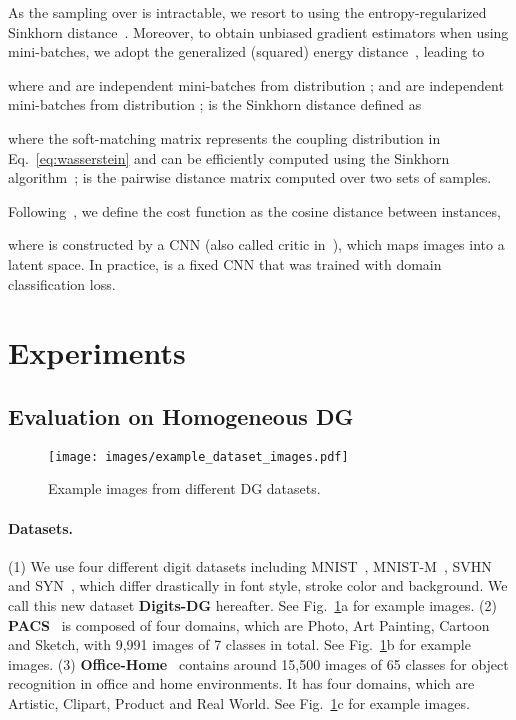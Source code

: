 \documentclass[runningheads]{llncs}
\begin{document}
As the sampling over  is intractable, we resort to using the entropy-regularized Sinkhorn distance~\cite{cuturi2013sinkhorn}. Moreover, to obtain unbiased gradient estimators when using mini-batches, we adopt the generalized (squared) energy distance~\cite{salimans2018improving}, leading to

where  and  are independent mini-batches from distribution ;  and  are independent mini-batches from distribution ;  is the Sinkhorn distance defined as

where the soft-matching matrix  represents the coupling distribution  in Eq.~\eqref{eq:wasserstein} and can be efficiently computed using the Sinkhorn algorithm~\cite{SinkhornAutoDiff};  is the pairwise distance matrix computed over two sets of samples.

Following~\cite{salimans2018improving}, we define the cost function as the cosine distance between instances,

where  is constructed by a CNN (also called critic in~\cite{salimans2018improving}), which maps images into a latent space. In practice,  is a fixed CNN that was trained with domain classification loss.

\section{Experiments} \label{sec:experiments}

\subsection{Evaluation on Homogeneous DG}

\begin{figure}[t]
    \centering
    \texttt{[image: images/example\_dataset\_images.pdf]}
    \caption{Example images from different DG datasets.}
    \label{fig:example_dataset_images}
\end{figure}

\paragraph{Datasets.}
(1) We use four different digit datasets including MNIST~\cite{lecun1998mnist}, MNIST-M~\cite{ganin2015unsupervised}, SVHN~\cite{netzer2011svhn} and SYN~\cite{ganin2015unsupervised}, which differ drastically in font style, stroke color and background. We call this new dataset \textbf{Digits-DG} hereafter. See Fig.~\ref{fig:example_dataset_images}a for example images.
(2) \textbf{PACS}~\cite{li2017deeper} is composed of four domains, which are Photo, Art Painting, Cartoon and Sketch, with 9,991 images of 7 classes in total. See Fig.~\ref{fig:example_dataset_images}b for example images.
(3) \textbf{Office-Home}~\cite{office_home} contains around 15,500 images of 65 classes for object recognition in office and home environments. It has four domains, which are Artistic, Clipart, Product and Real World. See Fig.~\ref{fig:example_dataset_images}c for example images.
\end{document}
